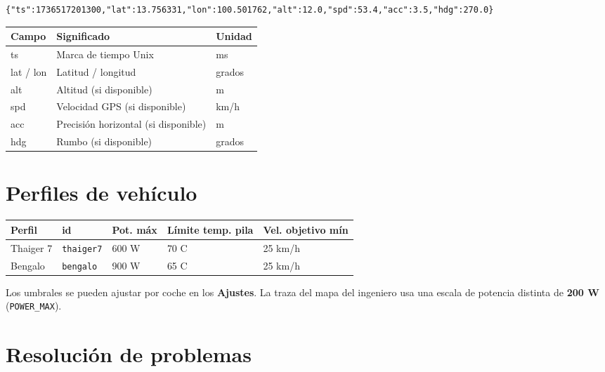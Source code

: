 \documentclass[11pt,a4paper,oneside]{report}
\newcommand{\degC}{\textdegree C}
\newcommand{\code}[1]{\texttt{#1}}
\begin{document}
\begin{lstlisting}
{"ts":1736517201300,"lat":13.756331,"lon":100.501762,"alt":12.0,"spd":53.4,"acc":3.5,"hdg":270.0}
\end{lstlisting}

\begin{tabularx}{\linewidth}{@{}lLl@{}}
\toprule
\textbf{Campo} & \textbf{Significado} & \textbf{Unidad}\\
\midrule
ts & Marca de tiempo Unix & ms\\
lat / lon & Latitud / longitud & grados\\
alt & Altitud (si disponible) & m\\
spd & Velocidad GPS (si disponible) & km/h\\
acc & Precisión horizontal (si disponible) & m\\
hdg & Rumbo (si disponible) & grados\\
\bottomrule
\end{tabularx}

\section{Perfiles de vehículo}

\begin{tabularx}{\linewidth}{@{}llllL@{}}
\toprule
\textbf{Perfil} & \textbf{id} & \textbf{Pot. máx} & \textbf{Límite temp. pila} & \textbf{Vel. objetivo mín}\\
\midrule
Thaiger 7 & \code{thaiger7} & 600 W & 70 \degC{} & 25 km/h\\
Bengalo & \code{bengalo} & 900 W & 65 \degC{} & 25 km/h\\
\bottomrule
\end{tabularx}

\medskip
Los umbrales se pueden ajustar por coche en los \textbf{Ajustes}. La traza del mapa
del ingeniero usa una escala de potencia distinta de \textbf{200 W}
(\code{POWER\_MAX}).

\section{Resolución de problemas}
\end{document}
